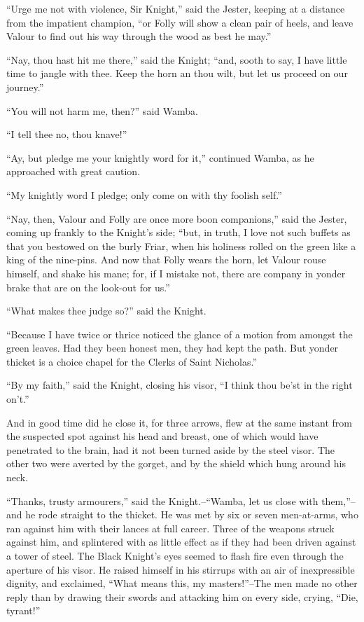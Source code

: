 ``Urge me not with violence, Sir Knight,'' said the Jester, keeping at a
distance from the impatient champion, ``or Folly will show a clean pair
of heels, and leave Valour to find out his way through the wood as best
he may.''

``Nay, thou hast hit me there,'' said the Knight; ``and, sooth to say, I
have little time to jangle with thee. Keep the horn an thou wilt, but
let us proceed on our journey.''

``You will not harm me, then?'' said Wamba.

``I tell thee no, thou knave!''

``Ay, but pledge me your knightly word for it,'' continued Wamba, as he
approached with great caution.

``My knightly word I pledge; only come on with thy foolish self.''

``Nay, then, Valour and Folly are once more boon companions,'' said the
Jester, coming up frankly to the Knight's side; ``but, in truth, I love
not such buffets as that you bestowed on the burly Friar, when his
holiness rolled on the green like a king of the nine-pins. And now that
Folly wears the horn, let Valour rouse himself, and shake his mane; for,
if I mistake not, there are company in yonder brake that are on the
look-out for us.''

``What makes thee judge so?'' said the Knight.

``Because I have twice or thrice noticed the glance of a motion from
amongst the green leaves. Had they been honest men, they had kept the
path. But yonder thicket is a choice chapel for the Clerks of Saint
Nicholas.''

``By my faith,'' said the Knight, closing his visor, ``I think thou
be'st in the right on't.''

And in good time did he close it, for three arrows, flew at the same
instant from the suspected spot against his head and breast, one of
which would have penetrated to the brain, had it not been turned aside
by the steel visor. The other two were averted by the gorget, and by the
shield which hung around his neck.

``Thanks, trusty armourers,'' said the Knight.--``Wamba, let us close
with them,''--and he rode straight to the thicket. He was met by six or
seven men-at-arms, who ran against him with their lances at full career.
Three of the weapons struck against him, and splintered with as little
effect as if they had been driven against a tower of steel. The Black
Knight's eyes seemed to flash fire even through the aperture of his
visor. He raised himself in his stirrups with an air of inexpressible
dignity, and exclaimed, ``What means this, my masters!''--The men made
no other reply than by drawing their swords and attacking him on every
side, crying, ``Die, tyrant!''

